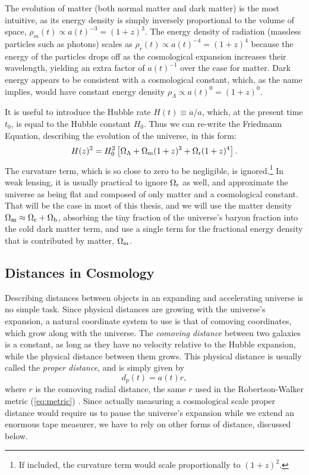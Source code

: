 The evolution of matter (both normal matter and dark matter) is the most intuitive, as its energy density is simply inversely proportional to the volume of space, $\rho_m(t) \propto a(t)^{-3} = (1+z)^{3}$. The energy density of radiation (massless particles such as photons) scales as $\rho_r(t) \propto a(t)^{-4} = (1+z)^{4}$ because the energy of the particles drops off as the cosmological expansion increases their wavelength, yielding an extra factor of $a(t)^{-1}$ over the case for matter. Dark energy appears to be consistent with a cosmological constant, which, as the name implies, would have constant energy density $\rho_{\Lambda} \propto a(t)^{0} = (1+z)^{0}$.

It is useful to introduce the Hubble rate $H(t) \equiv {\dot a}/a$, which, at the present time $t_0$, is equal to the Hubble constant $H_0$. Thus we can re-write the Friedmann Equation, describing the evolution of the universe, in this form:
\begin{equation}
H(z)^2 = H_0^2 \left[ \Omega_{\Lambda} + \Omega_{\rm m}(1+z)^3 + \Omega_{\rm r} (1+z)^4 \right].
\end{equation}
The curvature term, which is so close to zero to be negligible, is ignored.\footnote{If included, the curvature term would scale proportionally to $(1+z)^2$.} In weak lensing, it is usually practical to ignore $\Omega_{\rm r}$ as well, and approximate the universe as being flat and composed of only matter and a cosmological constant. That will be the case in most of this thesis, and we will use the matter density $\Omega_{\rm m} \approx \Omega_{\rm c} + \Omega_{\rm b}$, absorbing the tiny fraction of the universe's baryon fraction into the cold dark matter term, and use a single term for the fractional energy density that is contributed by matter, $\Omega_{\rm m}$. 



\subsection{Distances in Cosmology}
\label{sec:distances}

Describing distances between objects in an expanding and accelerating universe is no simple task. Since physical distances are growing with the universe's expansion, a natural coordinate system to use is that of comoving coordinates, which grow along with the universe. The {\it comoving distance} between two galaxies is a constant, as long as they have no velocity relative to the Hubble expansion, while the physical distance between them grows. This physical distance is usually called the {\it proper distance}, and is simply given by
\begin{equation}
d_p(t) = a(t)r,
\end{equation}
where $r$ is the comoving radial distance, the same $r$ used in the Robertson-Walker metric (\autoref{eq:metric}) \citep{RydenText}. Since actually measuring a cosmological scale proper distance would require us to pause the universe's expansion while we extend an enormous tape measurer, we have to rely on other forms of distance, discussed below. 

